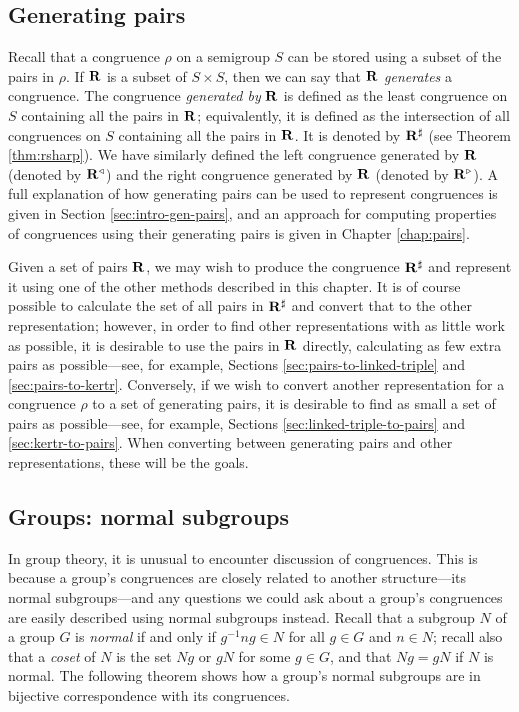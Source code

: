 \subsection{Generating pairs}
\label{sec:converting-pairs}
Recall that a congruence $\rho$ on a semigroup $S$ can be stored using
a subset of the pairs in $\rho$.  If $\mathbf{R}$ is a subset of $S \times S$,
then we can say that $\mathbf{R}$ \textit{generates} a congruence.  The
congruence \textit{generated by} $\mathbf{R}$ is defined as the least congruence
on $S$ containing all the pairs in $\mathbf{R}$; equivalently, it is defined as
the intersection of all congruences on $S$ containing all the pairs in
$\mathbf{R}$.  It is denoted by $\mathbf{R}^\sharp$ (see Theorem
\ref{thm:rsharp}).  We have similarly defined the left congruence generated by
$\mathbf{R}$ (denoted by $\mathbf{R}^\triangleleft$) and the right congruence
generated by $\mathbf{R}$ (denoted by $\mathbf{R}^\triangleright$).
A full explanation of how generating pairs can be used to represent congruences
is given in Section \ref{sec:intro-gen-pairs}, and an approach for computing
properties of congruences using their generating pairs is given in Chapter
\ref{chap:pairs}.

Given a set of pairs $\mathbf{R}$, we may wish to produce the congruence
$\mathbf{R}^\sharp$ and represent it using one of the other methods described in
this chapter.  It is of course possible to calculate the set of all pairs in
$\mathbf{R}^\sharp$ and convert that to the other representation; however, in
order to find other representations with as little work as possible, it is
desirable to use the pairs in $\mathbf{R}$ directly, calculating as few extra
pairs as possible---see, for example, Sections \ref{sec:pairs-to-linked-triple}
and \ref{sec:pairs-to-kertr}.  Conversely, if we wish to convert another
representation for a congruence $\rho$ to a set of generating pairs, it is
desirable to find as small a set of pairs as possible---see, for example,
Sections \ref{sec:linked-triple-to-pairs} and \ref{sec:kertr-to-pairs}.  When
converting between generating pairs and other representations, these will be the
goals.

\subsection{Groups: normal subgroups}
\label{sec:normal-subgroups}

In group theory, it is unusual to encounter discussion of congruences.  This is
because a group's congruences are closely related to another structure---its
normal subgroups---and any questions we could ask about a group's congruences are
easily described using normal subgroups instead.  Recall that a subgroup $N$ of
a group $G$ is \textit{normal} if and only if $g^{-1}ng \in N$ for all $g \in G$
and $n \in N$; recall also that a \textit{coset} of $N$ is the set $Ng$ or $gN$
for some $g \in G$, and that $Ng=gN$ if $N$ is normal.  The following theorem
shows how a group's normal subgroups are in bijective correspondence with its
congruences.

